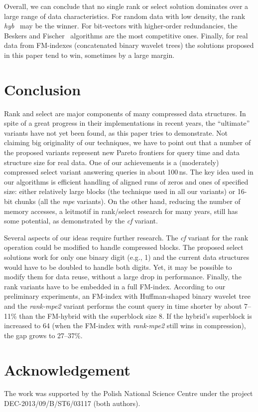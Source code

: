 \documentclass{llncs}
\begin{document}
Overall, we can conclude that no single rank or select solution 
dominates over a large range of data characteristics.
For random data with low density, the rank {\em hyb}~\cite{KKP14} 
may be the winner. 
For bit-vectors with higher-order redundancies, 
the Beskers and Fischer~\cite{BF14} algorithms are the most competitive ones.
Finally, for real data from FM-indexes (concatenated binary wavelet trees) 
the solutions proposed in this paper tend to win, 
sometimes by a large margin.


\section{Conclusion}
\noindent
Rank and select are major components of many compressed data structures.
In spite of a great progress in their implementations in recent years, 
the ``ultimate'' variants have not yet been found, as this paper tries 
to demonstrate.
Not claiming big originality of our techniques, we have to point out 
that a number of the proposed variants represent new Pareto frontiers 
for query time and data structure size for real data.
One of our achievements is a (moderately) compressed select variant 
answering queries in about 100\,ns.
The key idea used in our algorithms is efficient handling of aligned runs 
of zeros and ones of specified size: either relatively large blocks 
(the technique used in all our variants) or 16-bit chunks 
(all the {\em mpe} variants).
On the other hand, reducing the number of memory accesses, 
a leitmotif in rank/select research for many years, 
still has some potential, as demonstrated by the {\em cf} variant.

Several aspects of our ideas require further research. 
The {\em cf} variant for the rank operation could be modified to handle 
compressed blocks.
The proposed select solutions work for only one binary digit (e.g., 1) 
and the current data structures would have to be doubled 
to handle both digits. 
Yet, it may be possible to modify them for data reuse, without a large 
drop in performance.
Finally, the rank variants have to be embedded in a full FM-index.
According to our preliminary experiments, an FM-index with Huffman-shaped
binary wavelet tree and the {\em rank-mpe2} variant performs the 
count query in time shorter by about 7--11\% than the FM-hybrid 
with the superblock size 8.
If the hybrid's superblock is increased to 64 (when the FM-index with {\em rank-mpe2} still wins in compression), the gap grows to 27--37\%.



\section*{Acknowledgement}
\noindent
The work was supported by the 
Polish National Science Centre under the project DEC-2013/09/B/ST6/03117 
(both authors).



\end{document}
